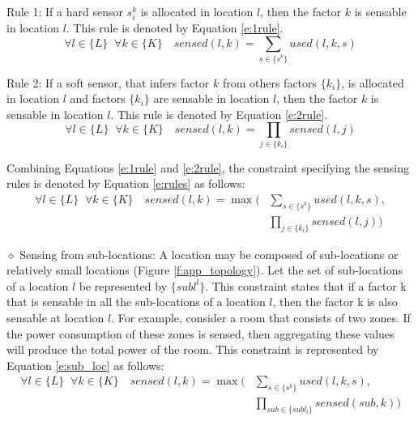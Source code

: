\noindent Rule 1: If a hard sensor $s_i^k$ is allocated in location $l$, then the factor $k$ is sensable in location $l$. 
This rule is denoted by Equation \eqref{e:1rule}.
\begin{equation}
\label{e:1rule}
\forall l \in \{L\} \;\; \forall k \in \{K\} \quad sensed(l,k) = 
\sum_{s \in \{s^k\}}  used(l,k,s)  
\end{equation}

\noindent Rule 2: If a soft sensor, that infers factor $k$ from others factors $\{k_i\}$, is allocated in location $l$ and factors $\{k_i\}$ are sensable in location $l$, then the factor $k$ is sensable in location $l$.
This rule is denoted by Equation \eqref{e:2rule}.
\begin{equation}
\label{e:2rule}
\forall l \in \{L\} \;\; \forall k \in \{K\} \quad sensed(l,k) = 
\prod_{j \in \{k_i\}} sensed(l,j)
\end{equation}

Combining Equations \eqref{e:1rule} and \eqref{e:2rule}, the constraint specifying the sensing rules is denoted by Equation \eqref{e:rules} as follows: 
\begin{equation}
\label{e:rules}
\begin{split}
\forall l \in \{L\} \;\; \forall k \in \{K\} \quad sensed(l,k) = \max \Bigg(
& \sum_{s \in \{s^k\}}  used(l,k,s) , \\
& \prod_{j \in \{k_i\}} sensed(l,j) \Bigg)
\end{split}
\end{equation}

\noindent $\diamond$ Sensing from sub-locations: A location may be composed of sub-locations or relatively small locations (Figure \ref{f:app_topology}). Let the set of sub-locations of a location $l$ be represented by $\{subl^l\}$. This constraint states that if a factor k that is sensable in all the sub-locations of a location $l$, then the factor k is also sensable at location $l$. For example, consider a room that consists of two zones. 
If the power consumption of these zones is sensed, then aggregating these values will produce the total power of the room.
This constraint is represented by Equation \eqref{e:sub_loc} as follows:
\begin{equation}
\label{e:sub_loc}
\begin{split}
\forall l \in \{L\} \;\; \forall k \in \{K\} \quad sensed(l,k) = \max \Bigg(
& \sum_{s \in \{s^k\}}  used(l,k,s) , \\
& \prod_{sub \in \{subl_l\}} sensed(sub,k) \Bigg)
\end{split}
\end{equation}

